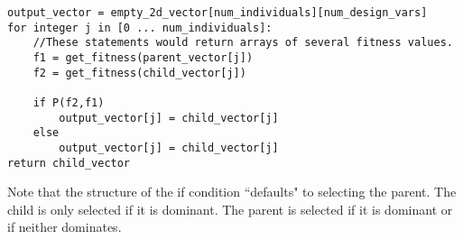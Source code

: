 \begin{lstlisting}[label=lst:modsel,caption=Modified Selection Operator,captionpos=b]
output_vector = empty_2d_vector[num_individuals][num_design_vars]
for integer j in [0 ... num_individuals]:
    //These statements would return arrays of several fitness values. 
    f1 = get_fitness(parent_vector[j])
    f2 = get_fitness(child_vector[j])

    if P(f2,f1)
        output_vector[j] = child_vector[j]
    else
        output_vector[j] = child_vector[j]
return child_vector
\end{lstlisting}
Note that the structure of the if condition ``defaults" to selecting the parent. The child is only selected if it is dominant. The parent is selected if it is dominant or if neither dominates. 

